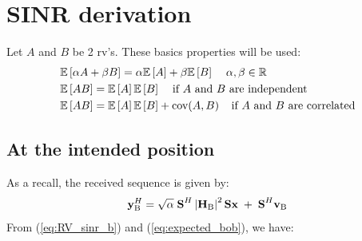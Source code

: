 \renewcommand{\theparagraph}{A}

\section{SINR derivation}\label{appA:SINR_deriv}
Let $A$ and $B$ be 2 \gls{rv}'s. These basics properties will be used:
\begin{equation}
    \begin{split}
        &\mathbb{E} \left[\alpha A + \beta B\right] = \alpha \mathbb{E} \left[A\right] + \beta \mathbb{E} \left[B\right] \; \;\; \;\alpha,\beta\in\mathbb{R} \\
        &\mathbb{E} \left[AB\right] = \mathbb{E} \left[A\right] \mathbb{E} \left[B\right] \; \;\; \; \text{if $A$ and $B$ are independent} \\
        &\mathbb{E} \left[AB\right] = \mathbb{E} \left[A\right] \mathbb{E} \left[B\right] + \text{cov}(A,B)\; \; \; \;\text{if $A$ and $B$ are correlated}
    \end{split} 
\end{equation}
\subsection{At the intended position}
As a recall, the received sequence is given by:
\begin{equation}
    \textbf{y}_{\text{B}}^H = \sqrt{\alpha} \; \textbf{S}^H \left|\textbf{H}_{\text{B}}\right|^2 \textbf{S} \textbf{x} \;  +  \;  \textbf{S}^H \textbf{v}_\text{B} 
    \label{eq:app:rx_bob_AN}
\end{equation}
From (\ref{eq:RV_sinr_b}) and (\ref{eq:expected_bob}), we have:

